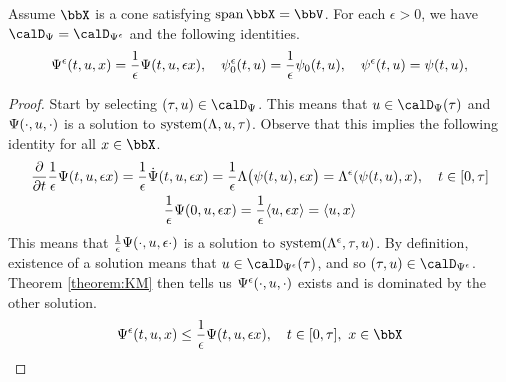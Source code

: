 \begin{proposition}
  \label{proposition:aff-asymptotics}
  Assume $\stateSpace$ is a cone satisfying $\operatorname{span}\stateSpace = \vecSpace$.
  For each $\epsilon > 0$, we have $\momentSpace = \momentSpacee$ and the following identities.
  \begin{equation*}
    \Psi^\epsilon(t, u, x) = \frac1\epsilon \Psi(t, u, \epsilon x), \quad 
    \psi^\epsilon_0(t,u) = \frac1\epsilon \psi_0(t,u), \quad
    \psi^\epsilon(t,u) = \psi(t,u), 
  \end{equation*}
\end{proposition}
\begin{proof}
  \label{proof:proposition:aff-asymptotics}
  Start by selecting $(\tau, \momentVar) \in \momentSpace$.
  This means that $\momentVar \in \momentSpace(\tau)$ and $\Psi(\cdot, u, \cdot)$ is a solution to $\operatorname{system}(\Lambda, u, \tau)$.
  Observe that this implies the following identity for all $\stateVar \in \stateSpace$.
  \begin{gather*}
    \label{eq:aff-dominated-1}
    \frac{\partial}{\partial t} \frac1\epsilon \Psi(t, u, \epsilon x) = \frac1\epsilon \dot{\Psi}(t, u, \epsilon x) = \frac1\epsilon \Lambda\big(\psi(t,u), \epsilon x\big) = \Lambda^\epsilon(\psi(t, u), x), \quad t \in [0,\tau] \\
    \frac1\epsilon\Psi(0,u, \epsilon x) = \frac1\epsilon{\langle u, \epsilon x\rangle} = {\langle u , x \rangle}
  \end{gather*}
  This means that $\frac1\epsilon\Psi(\cdot, u, \epsilon\cdot)$ is a solution to $\operatorname{system}(\Lambda^\epsilon, \tau, u)$.
  By definition, existence of a solution means that $\momentVar \in \momentSpacee(\tau)$, and so $(\tau, \momentVar) \in \momentSpacee$.
  Theorem \ref{theorem:KM} then tells us $\Psi^\epsilon(\cdot, u, \cdot)$ exists and is dominated by the other solution.
  \begin{equation*}
    \aff^\epsilon(t, \momentVar, \stateVar) \leq \frac1\epsilon \aff(t, \momentVar, \epsilon\stateVar), \quad t \in [0,\tau], ~ \stateVar \in \stateSpace
  \end{equation*}


\end{proof}
